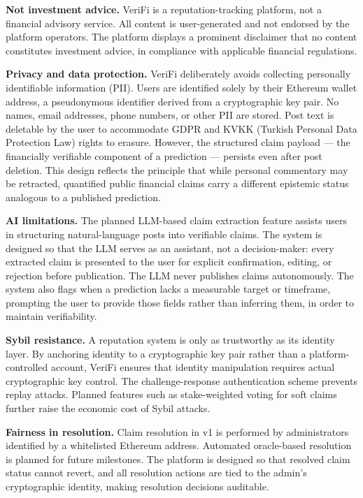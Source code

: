 \documentclass[a4paper,12pt]{report}
\begin{document}
\textbf{Not investment advice.} VeriFi is a reputation-tracking platform, not a financial advisory service. All content is user-generated and not endorsed by the platform operators. The platform displays a prominent disclaimer that no content constitutes investment advice, in compliance with applicable financial regulations.

\textbf{Privacy and data protection.} VeriFi deliberately avoids collecting personally identifiable information (PII). Users are identified solely by their Ethereum wallet address, a pseudonymous identifier derived from a cryptographic key pair. No names, email addresses, phone numbers, or other PII are stored. Post text is deletable by the user to accommodate GDPR and KVKK (Turkish Personal Data Protection Law) rights to erasure. However, the structured claim payload --- the financially verifiable component of a prediction --- persists even after post deletion. This design reflects the principle that while personal commentary may be retracted, quantified public financial claims carry a different epistemic status analogous to a published prediction.

\textbf{AI limitations.} The planned LLM-based claim extraction feature assists users in structuring natural-language posts into verifiable claims. The system is designed so that the LLM serves as an assistant, not a decision-maker: every extracted claim is presented to the user for explicit confirmation, editing, or rejection before publication. The LLM never publishes claims autonomously. The system also flags when a prediction lacks a measurable target or timeframe, prompting the user to provide those fields rather than inferring them, in order to maintain verifiability.

\textbf{Sybil resistance.} A reputation system is only as trustworthy as its identity layer. By anchoring identity to a cryptographic key pair rather than a platform-controlled account, VeriFi ensures that identity manipulation requires actual cryptographic key control. The challenge-response authentication scheme prevents replay attacks. Planned features such as stake-weighted voting for soft claims further raise the economic cost of Sybil attacks.

\textbf{Fairness in resolution.} Claim resolution in v1 is performed by administrators identified by a whitelisted Ethereum address. Automated oracle-based resolution is planned for future milestones. The platform is designed so that resolved claim status cannot revert, and all resolution actions are tied to the admin's cryptographic identity, making resolution decisions auditable.
\end{document}

